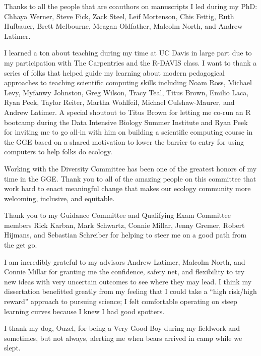 \documentclass[twoside,12pt,final]{ucthesis-CA2012}
\begin{document}
\begin{ucfrontmatter}
\begin{acknowledgements}
    Thanks to all the people that are coauthors on manuscripts I led during
    my PhD: Chhaya Werner, Steve Fick, Zack Steel, Leif Mortenson, Chis
    Fettig, Ruth Hufbauer, Brett Melbourne, Meagan Oldfather, Malcolm North,
    and Andrew Latimer.
    
    I learned a ton about teaching during my time at UC Davis in large part
    due to my participation with The Carpentries and the R-DAVIS class. I
    want to thank a series of folks that helped guide my learning about
    modern pedagogical approaches to teaching scientific computing skills
    including Noam Ross, Michael Levy, Myfanwy Johnston, Greg Wilson, Tracy
    Teal, Titus Brown, Emilio Laca, Ryan Peek, Taylor Reiter, Martha
    Wohlfeil, Michael Culshaw-Maurer, and Andrew Latimer. A special shoutout
    to Titus Brown for letting me co-run an R bootcamp during the Data
    Intensive Biology Summer Institute and Ryan Peek for inviting me to go
    all-in with him on building a scientific computing course in the GGE
    based on a shared motivation to lower the barrier to entry for using
    computers to help folks do ecology.
    
    Working with the Diversity Committee has been one of the greatest honors
    of my time in the GGE. Thank you to all of the amazing people on this
    committee that work hard to enact meaningful change that makes our
    ecology community more welcoming, inclusive, and equitable.
    
    Thank you to my Guidance Committee and Qualifying Exam Committee members
    Rick Karban, Mark Schwartz, Connie Millar, Jenny Gremer, Robert Hijmans,
    and Sebastian Schreiber for helping to steer me on a good path from the
    get go.
    
    I am incredibly grateful to my advisors Andrew Latimer, Malcolm North,
    and Connie Millar for granting me the confidence, safety net, and
    flexibility to try new ideas with very uncertain outcomes to see where
    they may lead. I think my dissertation benefitted greatly from my
    feeling that I could take a ``high risk/high reward'' approach to
    pursuing science; I felt comfortable operating on steep learning curves
    because I knew I had good spotters.
    
    I thank my dog, Ouzel, for being a Very Good Boy during my fieldwork and
    sometimes, but not always, alerting me when bears arrived in camp while
    we slept.
    

\end{acknowledgements}
\end{ucfrontmatter}
\end{document}
